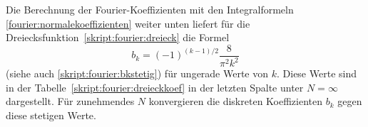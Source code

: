 Die Berechnung der Fourier-Koeffizienten mit den Integralformeln
\eqref{fourier:normalekoeffizienten}
weiter unten
liefert für die Dreiecksfunktion~\eqref{skript:fourier:dreieck}
die Formel
\[
b_k = (-1)^{(k-1)/2}\frac{8}{\pi^2k^2}
\]
(siehe auch \eqref{skript:fourier:bkstetig})
für ungerade Werte von $k$.
Diese Werte sind in der Tabelle~\ref{skript:fourier:dreieckkoef}
in der letzten Spalte unter $N=\infty$ dargestellt.
Für zunehmendes $N$ konvergieren die diskreten Koeffizienten $b_k$ gegen 
diese stetigen Werte.

